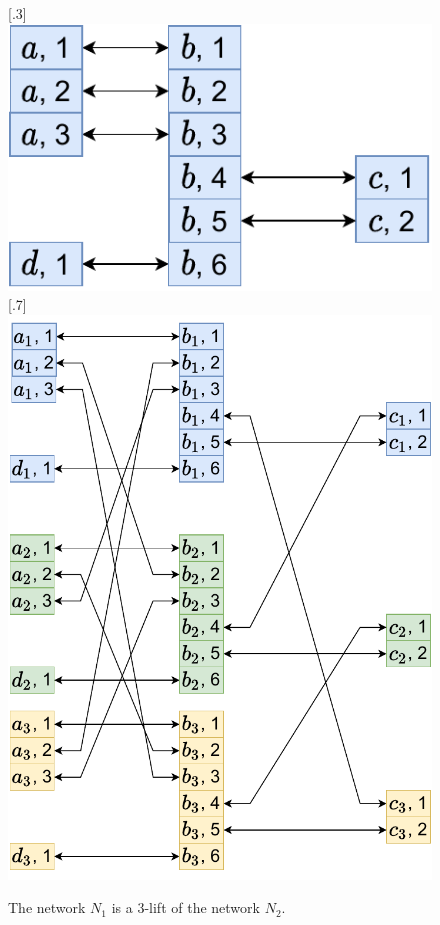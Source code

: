 \begin{figure}[H]
      [.3\linewidth] {
      \centering
      \includegraphics[scale=0.55]{diagrams/algorithm_k-lift_proof_simple_1.pdf}
    }%
      [.7\linewidth] {
      \centering
      \includegraphics[scale=0.55]{diagrams/algorithm_k-lift_proof_simple_2.pdf}
    }
    \caption{The network $N_1$ is a 3-lift of the network $N_2$.
    }
    \label{fig:algorithm:k-lift_proof_simple1}
  \end{figure}


